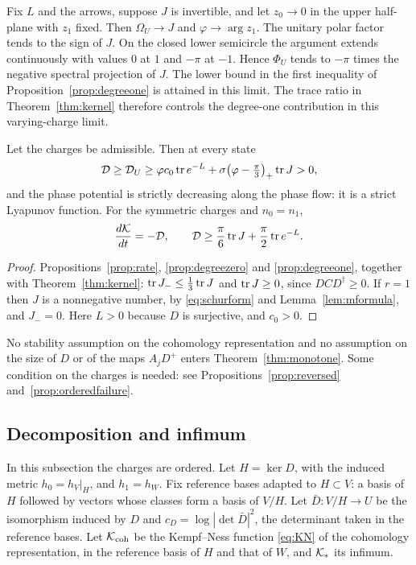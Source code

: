 \begin{remark}\label{rem:sharp}
Fix $L$ and the arrows, suppose $J$ is invertible, and let $z_0\to0$
in the upper half-plane with $z_1$ fixed. Then $\Omega_U\to J$ and
$\varphi\to\arg z_1$. The unitary polar factor tends to the sign of $J$.
On the closed lower semicircle the argument extends continuously with
values $0$ at $1$ and $-\pi$ at $-1$. Hence $\Phi_U$ tends to $-\pi$
times the negative spectral projection of $J$. The lower bound in the
first inequality of Proposition~\ref{prop:degreeone} is attained in this
limit. The trace ratio in Theorem~\ref{thm:kernel} therefore controls
the degree-one contribution in this varying-charge limit.
\end{remark}

\begin{theorem}\label{thm:monotone}
Let the charges be admissible. Then at every state
\begin{equation}\label{eq:dissipationbound}
 \mathcal D\geq\mathcal D_U\geq\varphi c_0\operatorname{tr} e^{-L}
 +\sigma\bigl(\varphi-\tfrac\pi3\bigr)_+\operatorname{tr} J>0,
\end{equation}
and the phase potential is strictly decreasing along the phase flow: it is a
strict Lyapunov function. For the symmetric charges and $n_0=n_1$,
\[
 \frac{d\mathcal K}{dt}=-\mathcal D,\qquad
 \mathcal D\geq\frac\pi6\operatorname{tr} J+\frac\pi2\operatorname{tr} e^{-L}.
\]
\end{theorem}

\begin{proof}
Propositions~\ref{prop:rate}, \ref{prop:degreezero} and \ref{prop:degreeone},
together with Theorem~\ref{thm:kernel}: $\operatorname{tr} J_-\leq\frac13\operatorname{tr} J$ and
$\operatorname{tr} J\geq0$, since $DCD^\dagger\geq0$. If $r=1$ then $J$ is a nonnegative
number, by \eqref{eq:schurform} and Lemma~\ref{lem:mformula}, and $J_-=0$.
Here $L>0$ because $D$ is surjective, and $c_0>0$.
\end{proof}

No stability assumption on the cohomology representation and no assumption on
the size of $D$ or of the maps $A_jD^+$ enters Theorem~\ref{thm:monotone}.
Some condition on the charges is needed: see
Propositions~\ref{prop:reversed} and~\ref{prop:orderedfailure}.

\subsection{Decomposition and infimum}
In this subsection the charges are ordered. Let $H=\ker D$, with the induced
metric $h_0=h_V|_H$, and $h_1=h_W$. Fix reference bases adapted to
$H\subset V$: a basis of $H$ followed by vectors whose classes form a basis
of $V/H$. Let $\bar D:V/H\to U$ be the isomorphism induced by $D$ and
$c_D=\log|\det\bar D|^2$, the determinant taken in the reference bases. Let
$\mathcal K_{\mathrm{coh}}$ be the Kempf--Ness function \eqref{eq:KN} of the cohomology
representation, in the reference basis of $H$ and that of $W$, and
$\mathcal K_*$ its infimum.

